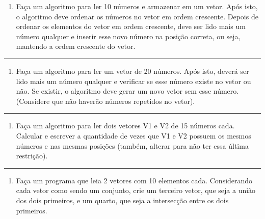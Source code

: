 \documentclass[12pt,a4paper]{article}
\renewcommand{\linethickness}{0.05em}
\providecommand{\tightlist}{%
      \setlength{\itemsep}{0pt}\setlength{\parskip}{0pt}}
\begin{document}
\begin{enumerate}
\def\labelenumi{\arabic{enumi}.}
\setcounter{enumi}{9}
\tightlist
\item
  Faça um algoritmo para ler 10 números e armazenar em um vetor. Após
  isto, o algoritmo deve ordenar os números no vetor em ordem crescente.
  Depois de ordenar os elementos do vetor em ordem crescente, deve ser
  lido mais um número qualquer e inserir esse novo número na posição
  correta, ou seja, mantendo a ordem crescente do vetor.
\end{enumerate}

    \begin{center}\rule{0.5\linewidth}{\linethickness}\end{center}

\begin{enumerate}
\def\labelenumi{\arabic{enumi}.}
\setcounter{enumi}{10}
\tightlist
\item
  Faça um algoritmo para ler um vetor de 20 números. Após isto, deverá
  ser lido mais um número qualquer e verificar se esse número existe no
  vetor ou não. Se existir, o algoritmo deve gerar um novo vetor sem
  esse número. (Considere que não haverão números repetidos no vetor).
\end{enumerate}

    \begin{center}\rule{0.5\linewidth}{\linethickness}\end{center}

\begin{enumerate}
\def\labelenumi{\arabic{enumi}.}
\setcounter{enumi}{11}
\tightlist
\item
  Faça um algoritmo para ler dois vetores V1 e V2 de 15 números cada.
  Calcular e escrever a quantidade de vezes que V1 e V2 possuem os
  mesmos números e nas mesmas posições (também, alterar para não ter
  essa última restrição).
\end{enumerate}

    \begin{center}\rule{0.5\linewidth}{\linethickness}\end{center}

\begin{enumerate}
\def\labelenumi{\arabic{enumi}.}
\setcounter{enumi}{12}
\tightlist
\item
  Faça um programa que leia 2 vetores com 10 elementos cada.
  Considerando cada vetor como sendo um conjunto, crie um terceiro
  vetor, que seja a união dos dois primeiros, e um quarto, que seja a
  intersecção entre os dois primeiros.
\end{enumerate}
\end{document}
